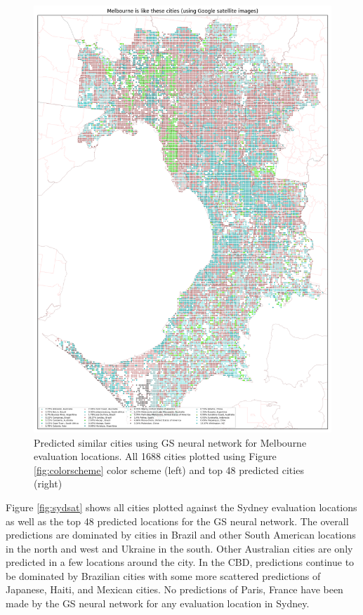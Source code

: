 \documentclass[sageh,times]{sagej}
\begin{document}
\begin{figure}[!htbp]
\includegraphics[scale=0.20]{Images/MelbourneOverallAbrev_sat.png} 
\caption{Predicted similar cities using GS neural network for Melbourne evaluation locations. All 1688 cities plotted using Figure \ref{fig:colorscheme} color scheme (left) and top 48 predicted cities (right)}    
 \label{fig:melsat}  
\end{figure} 



Figure \ref{fig:sydsat} shows all cities plotted against the Sydney evaluation locations as well as the top 48 predicted locations for the GS neural network. The overall predictions are dominated by cities in Brazil and other South American locations in the north and west and Ukraine in the south. Other Australian cities are only predicted in a few locations around the city. In the CBD, predictions continue to be dominated by Brazilian cities with some more scattered predictions of Japanese, Haiti, and Mexican cities. No predictions of Paris, France have been made by the GS neural network for any evaluation location in Sydney.
\end{document}
